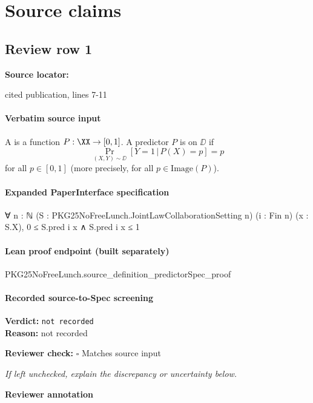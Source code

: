 \documentclass[10pt]{article}
\newcommand{\reviewerbox}{%
  \par\noindent\fbox{\parbox{0.96\linewidth}{\rule{0pt}{0.38in}}}\par
}
\newcommand{\reviewmatch}[1]{%
  \par\noindent\textbf{Reviewer check:} $\square$\; #1\par
  \noindent\emph{If left unchecked, explain the discrepancy or uncertainty below.}\par
}
\begin{document}
\clearpage
\hypertarget{source-claim-9384ebab7398c5e4}{}
\hypertarget{source-section-f10b5f68e4acf3dc}{}
\section*{Source claims}
\subsection*{Review row 1}
\textbf{Source locator:} {\footnotesize\raggedright cited publication, lines 7-\allowbreak{}11\par}
\paragraph{Verbatim source input}
\begin{ReviewVerbatim}
A  is a function $P: \XX\rightarrow [0,1]$. A predictor $P$ is  on $\DD$ if
\begin{equation}
    \Pr_{(X,Y)\sim \DD}[Y=1\,|\,P(X)=p] = p
\end{equation}
for all $p\in [0,1]$ (more precisely, for all $p\in \text{Image}(P)$).
\end{ReviewVerbatim}


\paragraph{Expanded PaperInterface specification}
\begin{ReviewVerbatim}
∀ {n : ℕ} (S : PKG25NoFreeLunch.JointLawCollaborationSetting n) (i : Fin n) (x : S.X), 0 ≤ S.pred i x ∧ S.pred i x ≤ 1
\end{ReviewVerbatim}

\paragraph{Lean proof endpoint (built separately)}\begin{ReviewVerbatim}
PKG25NoFreeLunch.source_definition_predictorSpec_proof
\end{ReviewVerbatim}

\paragraph{Recorded source-to-Spec screening}
\textbf{Verdict:} \texttt{not recorded}
\\
\textbf{Reason:} not recorded
\reviewmatch{Matches source input}
\noindent\textbf{Reviewer annotation}\par
\reviewerbox
\clearpage
\hypertarget{source-claim-05c0eaac9818a586}{}
\end{document}
